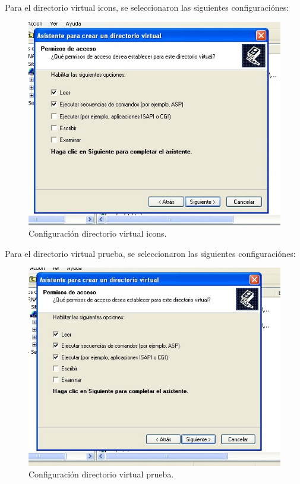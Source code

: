 \documentclass[12pt,letterpaper]{article}
\begin{document}
\begin{multicols}{2}
Para el directorio virtual icons, se seleccionaron las siguientes configuraciónes:\\

\begin{figure}[H]
\centering
\includegraphics[width = \columnwidth]{icons.jpeg}
\caption{Configuración directorio virtual icons.}
\label{SIIS}
\end{figure}


Para el directorio virtual prueba, se seleccionaron las siguientes configuraciónes:\\

\begin{figure}[H]
\centering
\includegraphics[width = \columnwidth]{prueba.jpeg}
\caption{Configuración directorio virtual prueba.}
\label{SIIS}
\end{figure}



\end{multicols}
\end{document}
